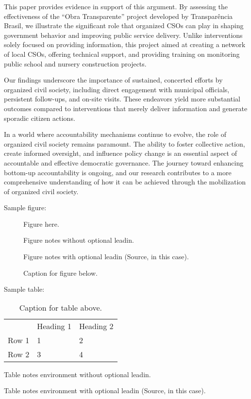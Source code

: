 \documentclass[]{AEA}
\begin{document}
This paper provides evidence in support of this argument. By assessing
the effectiveness of the ``Obra Transparente'' project developed by
Transparência Brasil, we illustrate the significant role that organized
CSOs can play in shaping government behavior and improving public
service delivery. Unlike interventions solely focused on providing
information, this project aimed at creating a network of local CSOs,
offering technical support, and providing training on monitoring public
school and nursery construction projects.

Our findings underscore the importance of sustained, concerted efforts
by organized civil society, including direct engagement with municipal
officials, persistent follow-ups, and on-site visits. These endeavors
yield more substantial outcomes compared to interventions that merely
deliver information and generate sporadic citizen actions.

In a world where accountability mechanisms continue to evolve, the role
of organized civil society remains paramount. The ability to foster
collective action, create informed oversight, and influence policy
change is an essential aspect of accountable and effective democratic
governance. The journey toward enhancing bottom-up accountability is
ongoing, and our research contributes to a more comprehensive
understanding of how it can be achieved through the mobilization of
organized civil society.

Sample figure:

\begin{figure}
Figure here.

\caption{Caption for figure below.}
\begin{figurenotes}
Figure notes without optional leadin.
\end{figurenotes}
\begin{figurenotes}[Source]
Figure notes with optional leadin (Source, in this case).
\end{figurenotes}
\end{figure}

Sample table:

\begin{table}
\caption{Caption for table above.}

\begin{tabular}{lll}
& Heading 1 & Heading 2 \\
Row 1 & 1 & 2 \\
Row 2 & 3 & 4%
\end{tabular}
\begin{tablenotes}
Table notes environment without optional leadin.
\end{tablenotes}
\begin{tablenotes}[Source]
Table notes environment with optional leadin (Source, in this case).
\end{tablenotes}
\end{table}
\end{document}
